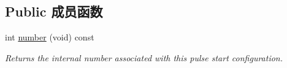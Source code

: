 \subsection*{Public 成员函数}
\begin{DoxyCompactItemize}
\item 
\hypertarget{classmv_i_m_p_a_c_t_1_1acquire_1_1_pulse_start_configuration_a6b11e5496a6f760409d72a1756125fe4}{int \hyperlink{classmv_i_m_p_a_c_t_1_1acquire_1_1_pulse_start_configuration_a6b11e5496a6f760409d72a1756125fe4}{number} (void) const }\label{classmv_i_m_p_a_c_t_1_1acquire_1_1_pulse_start_configuration_a6b11e5496a6f760409d72a1756125fe4}

\begin{DoxyCompactList}\small\item\em Returns the internal number associated with this pulse start configuration. \end{DoxyCompactList}\end{DoxyCompactItemize}
